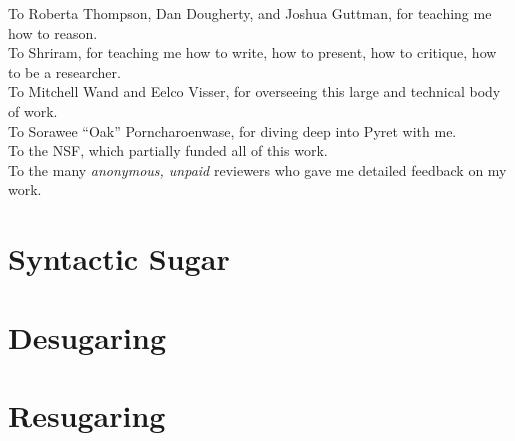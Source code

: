 \documentclass[
  10pt,
  paper=letter,
  footinclude=true,
  headinclude=true,
  american
]{scrbook}
\makeatletter
\renewcommand{\<}{\le}
\newcommand{\ArabicNumbering}{
  \clearscrheadfoot
  \pagenumbering{arabic}
  \lehead{\mbox{\llap{\small\pagemark\kern2em}\headmark\hfil}}
  \rohead{\mbox{\hfil{\headmark}\rlap{\small\kern2em\pagemark}}}
}
\newif\if@draft
\newif\ifl@fpage
\newif\ifl@tpage
\newif\ifl@epage
\newif\ift@cpage
\def\single@spacing{\def\baselinestretch{1}}
\def\final@spacing{\def\baselinestretch{1.3}}
\let\@disclaimer\@empty
\def\afterpreface{\cleardoublepage
  \ift@cpage
  \tableofcontents
  \ifx\@disclaimer\@empty
      \else
      \vspace{0.5cm}
      \single@spacing
      \noindent
      \hangindent\parindent
      \makebox[\parindent][l]{\raisebox{0.2ex}{\large{$\star$}} }\@disclaimer
      \if@draft\single@spacing\else\final@spacing\fi
    \fi
    \cleardoublepage\fi
  \ifl@fpage\addcontentsline{toc}{chapter}{List of Figures}\listoffigures
    \cleardoublepage\fi
  \ifl@epage\addcontentsline{toc}{chapter}{List of Examples}\listofexamples
    \cleardoublepage\fi}
\makeatother
\begin{document}
  \noindent To Roberta Thompson, Dan Dougherty, and Joshua Guttman,
  for teaching me how to reason.\\

  \noindent To Shriram, for teaching me how to write, how to present,
  how to critique, how to be a researcher.\\

  \noindent To Mitchell Wand and Eelco Visser, for overseeing this
  large and technical body of work.\\

  \noindent To Sorawee ``Oak'' Porncharoenwase, for diving deep into
  Pyret with me.\\

  \noindent To the NSF, which partially funded all of this work.\\

  \noindent To the many \emph{anonymous, unpaid} reviewers who gave me
  detailed feedback on my work.

\afterpreface

\ArabicNumbering


\part{Syntactic Sugar}

\part{Desugaring}


\part{Resugaring}






\end{document}
